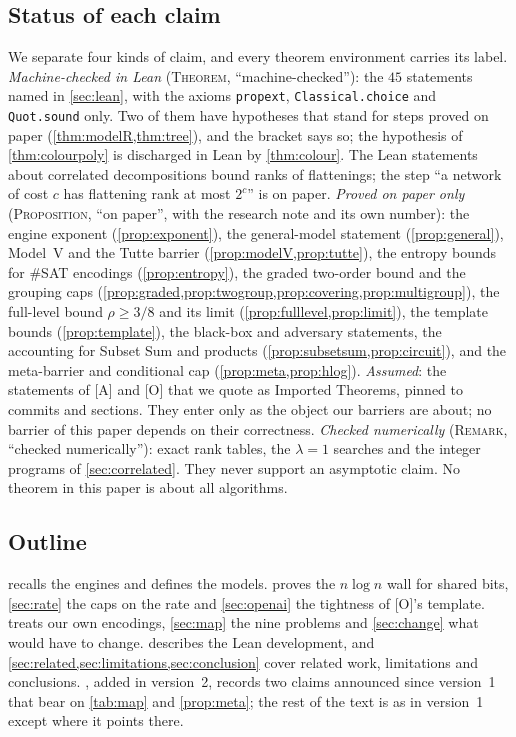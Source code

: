 \documentclass[10pt]{amsart}
\theoremstyle{plain}
\theoremstyle{definition}
\theoremstyle{remark}
\numberwithin{equation}{section}
\newcommand{\A}{\textup{[A]}}
\newcommand{\Oa}{\textup{[O]}}
\begin{document}
\subsection{Status of each claim}\label{sec:status}
We separate four kinds of claim, and every theorem environment carries its label.
\emph{Machine-checked in Lean} (\textsc{Theorem}, ``machine-checked''): the $45$ statements named in
\cref{sec:lean}, with the axioms \texttt{propext}, \texttt{Classical.choice} and \texttt{Quot.sound}
only. Two of them have hypotheses that stand for steps proved on paper
(\cref{thm:modelR,thm:tree}), and the bracket says so; the hypothesis of \cref{thm:colourpoly} is
discharged in Lean by \cref{thm:colour}. The Lean statements about
correlated decompositions bound ranks of flattenings; the step ``a network of cost $c$ has
flattening rank at most $2^c$'' is on paper.
\emph{Proved on paper only} (\textsc{Proposition}, ``on paper'', with the research note and its own
number): the engine exponent (\cref{prop:exponent}), the general-model statement
(\cref{prop:general}), Model~V and the Tutte barrier (\cref{prop:modelV,prop:tutte}), the entropy
bounds for $\#$SAT encodings (\cref{prop:entropy}), the graded two-order bound and the grouping caps
(\cref{prop:graded,prop:twogroup,prop:covering,prop:multigroup}), the full-level bound
$\rho\ge3/8$ and its limit (\cref{prop:fulllevel,prop:limit}), the template bounds
(\cref{prop:template}), the black-box and adversary statements, the accounting for Subset Sum and
products (\cref{prop:subsetsum,prop:circuit}), and the meta-barrier and conditional cap
(\cref{prop:meta,prop:hlog}).
\emph{Assumed}: the statements of \A{} and \Oa{} that we quote as Imported Theorems, pinned to
commits and sections. They enter only as the object our barriers are about; no barrier of this paper
depends on their correctness.
\emph{Checked numerically} (\textsc{Remark}, ``checked numerically''): exact rank tables, the
$\lambda=1$ searches and the integer programs of \cref{sec:correlated}. They never support an
asymptotic claim. No theorem in this paper is about all algorithms.

\subsection*{Outline}
 recalls the engines and defines the models.  proves the
$n\log n$ wall for shared bits, \cref{sec:rate} the caps on the rate and \cref{sec:openai} the
tightness of \Oa's template.  treats our own encodings, \cref{sec:map} the nine
problems and \cref{sec:change} what would have to change.  describes the Lean
development, and \cref{sec:related,sec:limitations,sec:conclusion} cover related work, limitations
and conclusions. , added in version~2, records two claims announced since version~1 that
bear on \cref{tab:map} and \cref{prop:meta}; the rest of the text is as in version~1 except where it
points there.
\end{document}
